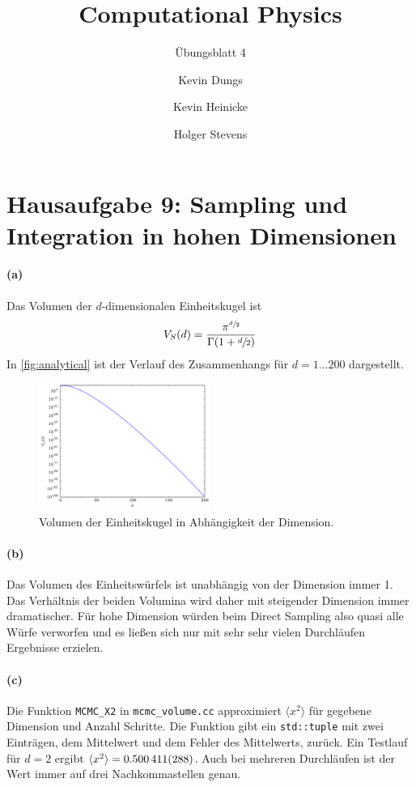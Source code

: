 \documentclass{scrartcl}
\author{Kevin Dungs \and Kevin Heinicke \and Holger Stevens}
\title{Computational Physics}
\subtitle{Übungsblatt 4}
\begin{document}
\maketitle

\section*{Hausaufgabe 9: Sampling und Integration in hohen Dimensionen}
\paragraph{(a)} Das Volumen der $d$-dimensionalen Einheitskugel ist
\begin{equation}
    V_S(d) = \frac{\pi^{\sfrac{d}{2}}}{\Gamma(1 + \sfrac{d}{2})}
\end{equation}
In \autoref{fig:analytical} ist der Verlauf des Zusammenhangs für $d=1\dots200$ dargestellt.

\begin{figure}[H]
    \centering
    \includegraphics[width=0.5\textwidth]{plots/analytical.pdf}
    \caption{Volumen der Einheitskugel in Abhängigkeit der Dimension.}
    \label{fig:analytical}
\end{figure}

\paragraph{(b)} Das Volumen des Einheitswürfels ist unabhängig von der Dimension immer \num{1}. Das Verhältnis der beiden Volumina wird daher mit steigender Dimension immer dramatischer. Für hohe Dimension würden beim Direct Sampling also quasi alle Würfe verworfen und es ließen sich nur mit sehr sehr vielen Durchläufen Ergebnisse erzielen.

\paragraph{(c)} Die Funktion \texttt{MCMC\_X2} in \texttt{mcmc\_volume.cc} approximiert $\langle x^2\rangle$ für gegebene Dimension und Anzahl Schritte. Die Funktion gibt ein \texttt{std::tuple} mit zwei Einträgen, dem Mittelwert und dem Fehler des Mittelwerts, zurück. Ein Testlauf für $d=2$ ergibt $\langle x^2\rangle = \num{0.500411 \pm 0.000288}$. Auch bei mehreren Durchläufen ist der Wert immer auf drei Nachkommastellen genau.
\end{document}
